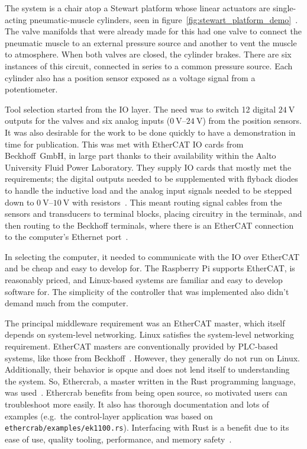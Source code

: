 \documentclass[english,12pt,a4paper,pdftex,eng,utf8]{aaltothesis}
\begin{document}
The system is a chair atop a Stewart platform whose linear actuators are single-acting pneumatic-muscle cylinders, seen in figure~\ref{fig:stewart_platform_demo}~\cite{Stewart1965, Caldwell1995}. The valve manifolds that were already made for this had one valve to connect the pneumatic muscle to an external pressure source and another to vent the muscle to atmosphere. When both valves are closed, the cylinder brakes. There are six instances of this circuit, connected in series to a common pressure source. Each cylinder also has a position sensor exposed as a voltage signal from a potentiometer.

Tool selection started from the IO layer. The need was to switch 12 digital $\qty{24}{\volt}$ outputs for the valves and six analog inputs ($\qtyrange[range-units=single,range-phrase=..]{0}{24}{\volt}$) from the position sensors. It was also desirable for the work to be done quickly to have a demonstration in time for publication. This was met with EtherCAT IO cards from Beckhoff~GmbH, in large part thanks to their availability within the Aalto University Fluid Power Laboratory. They supply IO cards that mostly met the requirements; the digital outputs needed to be supplemented with flyback diodes to handle the inductive load and the analog input signals needed to be stepped down to $\qtyrange[range-units=single,range-phrase=..]{0}{10}{\volt}$ with resistors~\cite{BeckhoffEL2042,BeckhoffEL3062}. This meant routing signal cables from the sensors and transducers to terminal blocks, placing circuitry in the terminals, and then routing to the Beckhoff terminals, where there is an EtherCAT connection to the computer's Ethernet port~\cite{BeckhoffEK1100}.

In selecting the computer, it needed to communicate with the IO over EtherCAT and be cheap and easy to develop for. The Raspberry Pi supports EtherCAT, is reasonably priced, and Linux-based systems are familiar and easy to develop software for.  The simplicity of the controller that was implemented also didn't demand much from the computer.

The principal middleware requirement was an EtherCAT master, which itself depends on system-level networking. Linux satisfies the system-level networking requirement. EtherCAT masters are conventionally provided by PLC-based systems, like those from Beckhoff~\cite{BeckhoffTwinCAT}. However, they generally do not run on Linux. Additionally, their behavior is opque and does not lend itself to understanding the system. So, Ethercrab, a master written in the Rust programming language, was used~\cite{Ethercrab}. Ethercrab benefits from being open source, so motivated users can troubleshoot more easily. It also has thorough documentation and lots of examples (e.g.\ the control-layer application was based on \verb|ethercrab/examples/ek1100.rs|). Interfacing with Rust is a benefit due to its ease of use, quality tooling, performance, and memory safety~\cite{RustHomePage}.
\end{document}
